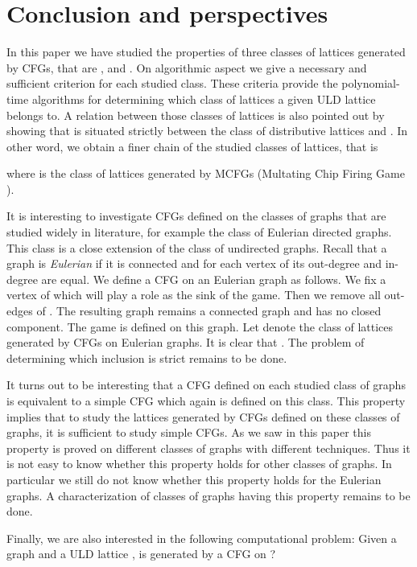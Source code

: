 \documentclass{article}
\theoremstyle{definition}
\begin{document}
\section{Conclusion and perspectives}
\label{sixth section}
In this paper we have studied the properties of three classes of lattices generated by CFGs, that are ,  and . On algorithmic aspect we give a necessary and sufficient criterion for each studied class. These criteria provide the polynomial-time algorithms for determining which class of lattices a given ULD lattice belongs to. A relation between those classes of lattices is also pointed out by showing that  is situated strictly between the class of distributive lattices and . In other word, we obtain a finer chain of the studied classes of lattices, that is

where  is the class of lattices generated by MCFGs (Multating Chip Firing Game \cite{B97,H99,Mag03}).

It is interesting to investigate CFGs defined on the classes  of graphs that are studied widely in literature, for example the class of Eulerian directed graphs. This class is a close extension of the class of undirected graphs. Recall that a graph  is \emph{Eulerian} if it is connected and for each vertex of  its out-degree and in-degree are equal. We define a CFG on an Eulerian graph  as follows. We fix a vertex  of  which will play a role as the sink of the game. Then we remove all out-edges of . The resulting graph  remains a connected graph and has no closed component. The game is defined on this graph. Let  denote the class of lattices generated by CFGs on Eulerian graphs. It is clear that . The problem of determining which inclusion is strict remains to be done.  

It turns out to be interesting that a CFG defined on each studied class of graphs is equivalent to a simple CFG which again is defined on this class. This property implies that to study the lattices generated by CFGs defined on these classes of graphs, it is sufficient to study simple CFGs. As we saw in this paper this property is proved on different classes of graphs with different techniques. Thus it is not easy to know whether this property holds for other classes of graphs. In particular we still do not know whether this property holds for the Eulerian graphs. A  characterization of classes of graphs having this property remains to be done.

Finally, we are also interested in the following computational problem: Given a graph  and a ULD lattice , is  generated by a CFG on ?
\end{document}
